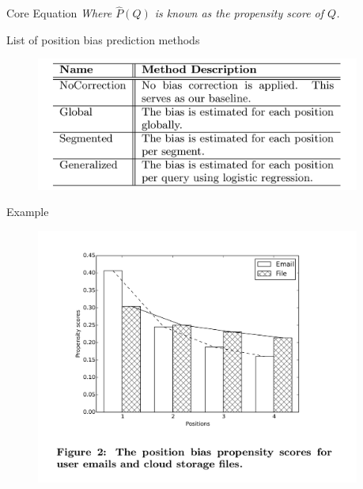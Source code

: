 \documentclass[final]{beamer}
\newlength{\sepwidth}
\newlength{\colwidth}
\newcommand{\separatorcolumn}{\begin{column}{\sepwidth}\end{column}}
\begin{document}
\begin{frame}[t]
\begin{columns}[t]
\begin{column}{\colwidth}
\begin{block}{Core Equation}
    \textit{Where \({\hat{P}(Q)}\) is known as the propensity score of \(Q\).}
  \end{block}

  \begin{block}{List of position bias prediction methods}
	   \begin{figure}
	\centering
	\includegraphics[width=0.9\linewidth]{fig 2.png}
	\end{figure}
  \end{block}


	\begin{block}{Example}
	    \begin{figure}
		\centering
		\includegraphics[width=0.9\linewidth]{fig 3.png}
		\end{figure}
	\end{block}
	

\end{column}

\separatorcolumn
\end{columns}
\end{frame}
\end{document}
